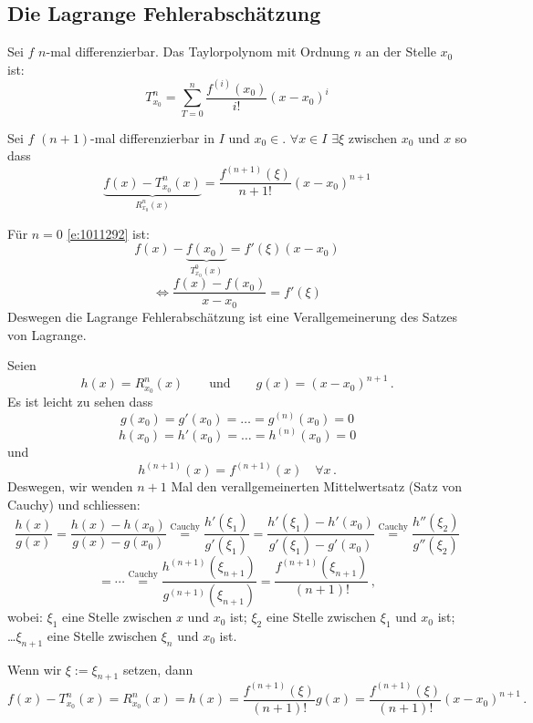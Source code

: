 \subsection{Die Lagrange Fehlerabschätzung}
\begin{Def}
  Sei $f$ $n$-mal differenzierbar. Das Taylorpolynom mit Ordnung $n$ an der Stelle $x_0$ ist:
  \[T^n_{x_0}=\sum^n_{T=0}\frac{f^{(i)}(x_0)}{i!}(x-x_0)^i\]
\end{Def}
\begin{Sat}
  Sei $f$ $(n+1)$-mal differenzierbar in $I$ und $x_0\in$. $\forall x\in I$ 
$\exists\xi$ zwischen $x_0$ und $x$ so dass
  \begin{equation}\label{e:1011292}
    \underbrace{f(x)-T^n_{x_0}(x)}_{R_{x_0}^n (x)}=\frac{f^{(n+1)}(\xi)}{n+1!}(x-x_0)^{n+1}
  \end{equation}
\end{Sat}
\begin{Bem}
  Für $n=0$ \eqref{e:1011292} ist:
  \[f(x)-\underbrace{f(x_0)}_{T^0_{x_0}(x)}=f'(\xi)(x-x_0)\]
  \[\iff\frac{f(x)-f(x_0)}{x-x_0}=f'(\xi)\]
Deswegen die Lagrange Fehlerabsch\"atzung ist eine Verallgemeinerung
des Satzes von Lagrange.
\end{Bem}
\begin{Bew} Seien
\[
h (x) = R^n_{x_0} (x) \qquad \mbox{und} \qquad g(x) = (x-x_0)^{n+1}\, .
\]
Es ist leicht zu sehen dass
\[
g (x_0) = g' (x_0) = \ldots = g^{(n)} (x_0) = 0
\]
\[
h(x_0) = h'(x_0) = \ldots = h^{(n)} (x_0) = 0
\]
und 
\[
h^{(n+1)} (x) = f^{(n+1)} (x) \quad\forall x\, .
\]
Deswegen, wir wenden $n+1$ Mal den verallgemeinerten Mittelwertsatz (Satz von Cauchy)
und schliessen: 
  \[\frac{h(x)}{g(x)} = \frac{h(x)-h(x_0)}{g(x)-g(x_0)}
\stackrel{\text{Cauchy}}{=}\frac{h'(\xi_1)}{g'(\xi_1)}=
\frac{h'(\xi_1)-h'(x_0)}{g'(\xi_1)-g'(x_0)}\stackrel{\text{Cauchy}}{=}
\frac{h''(\xi_2)}{g''(\xi_2)}\]
\[=\cdots\stackrel{\text{Cauchy}}{=}
\frac{h^{(n+1)}(\xi_{n+1})}{g^{(n+1)}(\xi_{n+1})}=\frac{f^{(n+1)}(\xi_{n+1})}{(n+1)!}\, ,\]
wobei: $\xi_1$ eine Stelle zwischen $x$ und $x_0$ ist; $\xi_2$ eine Stelle zwischen $\xi_1$
und $x_0$ ist; \ldots $\xi_{n+1}$ eine Stelle zwischen $\xi_n$ und $x_0$ ist.

Wenn wir $\xi:=\xi_{n+1}$ setzen, dann
\[f(x)-T^n_{x_0}(x) = R^n_{x_0} (x) = h (x)=
\frac{f^{(n+1)} (\xi)}{(n+1)!} g (x) =
\frac{f^{(n+1)}(\xi)}{(n+1)!} (x-x_0)^{n+1}\, .\]
\end{Bew}
